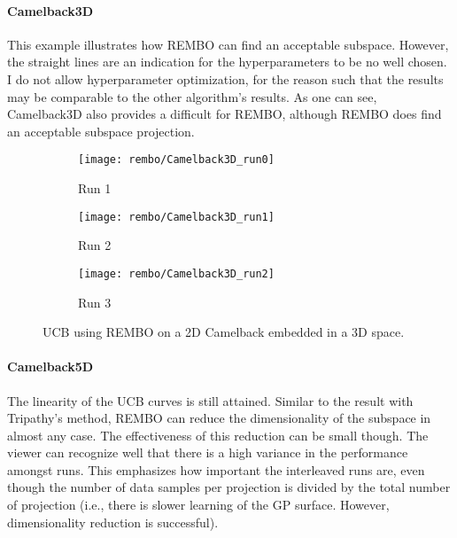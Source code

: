 \paragraph{Camelback3D}
This example illustrates how REMBO can find an acceptable subspace.
However, the straight lines are an indication for the hyperparameters to be no well chosen.
I do not allow hyperparameter optimization, for the reason such that the results may be comparable to the other algorithm's results.
As one can see, Camelback3D also provides a difficult for REMBO, although REMBO does find an acceptable subspace projection.

\begin{figure}[H]
\center
    \begin{subfigure}[b]{0.30\textwidth}
        \texttt{[image: rembo/Camelback3D\_run0]}
        \label{fig:gull}
         \caption{Run 1}
    \end{subfigure}
        \begin{subfigure}[b]{0.30\textwidth}
        \texttt{[image: rembo/Camelback3D\_run1]}
        \label{fig:gull}
        \caption{Run 2}
    \end{subfigure}
    \begin{subfigure}[b]{0.30\textwidth}
        \texttt{[image: rembo/Camelback3D\_run2]}
        \label{fig:gull}
               \caption{Run 3}
    \end{subfigure}
        \caption{UCB using REMBO on a 2D Camelback embedded in a 3D space.
    }\label{fig:animals}
\end{figure}

\paragraph{Camelback5D}
The linearity of the UCB curves is still attained.
Similar to the result with Tripathy's method, REMBO can reduce the dimensionality of the subspace in almost any case.
The effectiveness of this reduction can be small though.
The viewer can recognize well that there is a high variance in the performance amongst runs.
This emphasizes how important the interleaved runs are, even though the number of data samples per projection is divided by the total number of projection (i.e., there is slower learning of the GP surface. However, dimensionality reduction is successful).


